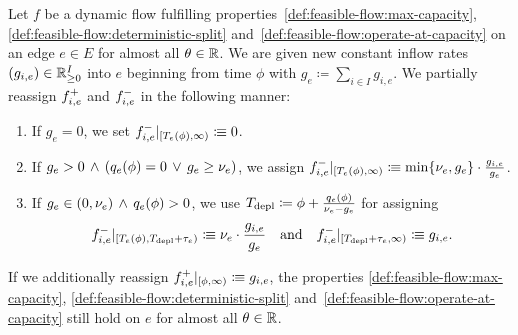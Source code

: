 \begin{theorem}\label{thm:extend-edge}
    Let $f$ be a dynamic flow fulfilling properties~\ref{def:feasible-flow:max-capacity}, \ref{def:feasible-flow:deterministic-split} and~\ref{def:feasible-flow:operate-at-capacity} on an edge $e\in E$ for almost all $\theta\in\mathbb{R}$.
    We are given new constant inflow rates $(g_{i,e})\in\mathbb{R}_{\geq0}^{I}$ into $e$ beginning from time $\phi$ with $g_e \coloneqq \sum_{i\in I} g_{i,e}$.
    We partially reassign ${f}^+_{i,e}$ and ${f}^-_{i,e}$ in the following manner:
    \begin{enumerate}[label=\textbf{Case \Roman*.}, wide=0.5em, labelwidth=4.5em]
        \item If $g_e = 0$, we set ${f}^-_{i,e}\vert_{[T_e(\phi), \infty)} \vcentcolon\mspace{-1.2mu}\equiv 0$.
        
        \item If $g_e > 0 \,\land\, \left( q_e(\phi) = 0 \,\lor\, g_e \geq \nu_e \right)$, we assign ${f}^-_{i,e}\vert_{[T_e(\phi), \infty)} \vcentcolon\mspace{-1.2mu}\equiv \min\{\nu_e, g_e\}\cdot \frac{g_{i,e}}{g_e}$.
        
        \item If $g_e \in (0, \nu_e) \,\land\, q_e(\phi) > 0$, we use $T_{\textnormal{depl}} \coloneqq \phi + \frac{q_e(\phi)}{\nu_e - g_e}$ for assigning
        \begin{align*}
            {f}^-_{i,e}\vert_{[T_e(\phi), T_{\textnormal{depl}} + \tau_e)}
            \vcentcolon\mspace{-1.2mu}\equiv \nu_e \cdot \frac{g_{i,e}}{g_e}
            \quad\text{and}\quad
            {f}^-_{i,e}\vert_{[T_{\textnormal{depl}} + \tau_e, \infty)}
            \vcentcolon\mspace{-1.2mu}\equiv g_{i,e}.
        \end{align*}
    \end{enumerate}
    If we additionally reassign ${f}^+_{i,e}\vert_{[\phi,\infty)} \vcentcolon\mspace{-1.2mu}\equiv g_{i,e}$,
    the properties \ref{def:feasible-flow:max-capacity}, \ref{def:feasible-flow:deterministic-split} and~\ref{def:feasible-flow:operate-at-capacity} still hold on $e$ for almost all $\theta\in \mathbb{R}$.
\end{theorem}
